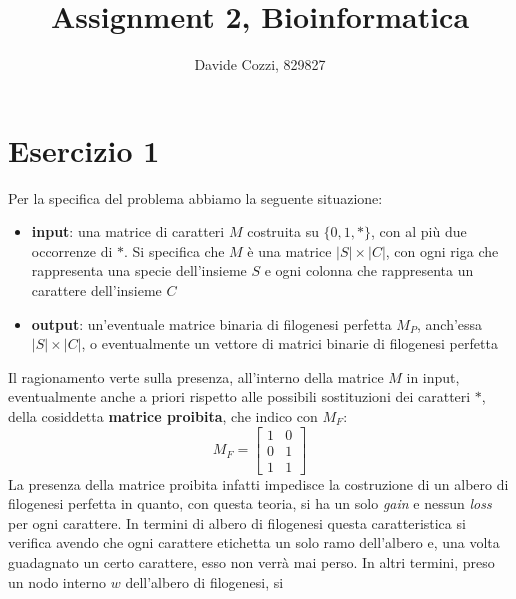 \documentclass[a4paper,12pt, oneside]{book}
\title{Assignment 2, Bioinformatica}
\author{Davide Cozzi, 829827}
\date{}
\begin{document}
\maketitle

\newtheorem{teorema}{Teorema}
\newtheorem{definizione}{Definizione}
\newtheorem{esempio}{Esempio}
\newtheorem{corollario}{Corollario}
\newtheorem{lemma}{Lemma}
\newtheorem{osservazione}{Osservazione}
\newtheorem{nota}{Nota}
\newtheorem{esercizio}{Esercizio}

\renewcommand{\chaptermark}[1]{%
  \markboth{\chaptername
    \ \thechapter.\ #1}{}}
\renewcommand{\sectionmark}[1]{\markright{\thesection.\ #1}}
\tableofcontents
\chapter{Esercizio 1}
Per la specifica del problema abbiamo la seguente situazione:
\begin{itemize}
  \item \textbf{input}: una matrice di caratteri $M$ costruita su $\{0,1,*\}$,
  con al più due occorrenze di $*$. Si specifica che $M$ è una matrice
  $|S|\times |C|$, con ogni riga che rappresenta una specie dell'insieme $S$ e
  ogni colonna che rappresenta un carattere dell'insieme $C$ 
  \item \textbf{output}: un'eventuale matrice binaria di filogenesi perfetta
  $M_P$, anch'essa $|S|\times |C|$, o eventualmente un vettore di matrici
  binarie di filogenesi perfetta
\end{itemize}
Il ragionamento verte sulla presenza, all'interno della matrice $M$ in input,
eventualmente anche a priori rispetto alle possibili sostituzioni dei caratteri
$*$, della cosiddetta \textbf{matrice proibita}, che indico con $M_F$:
\[
  M_F=\left[
    \begin{matrix}
      1 & 0\\
      0 & 1\\
      1 & 1
    \end{matrix}
  \right]
\]
La presenza della matrice proibita infatti impedisce la costruzione di un albero
di filogenesi perfetta in quanto, con questa teoria, si ha un solo \textit{gain}
e nessun \textit{loss} per ogni carattere. In termini di albero di filogenesi
questa caratteristica si verifica avendo che ogni carattere etichetta un solo
ramo dell'albero e, una volta guadagnato un certo carattere, esso non verrà mai
perso. In altri termini, preso un nodo interno $w$ dell'albero di filogenesi, si
\end{document}
